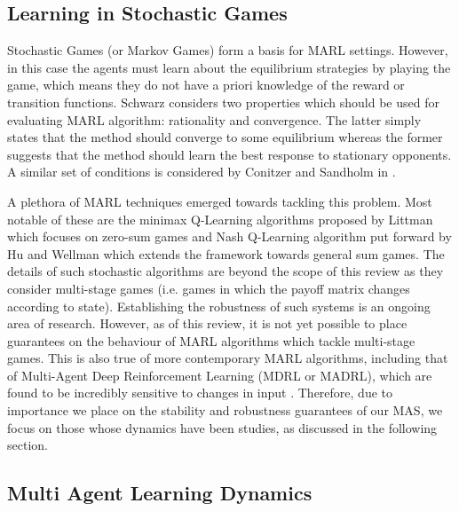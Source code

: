 \documentclass[.../main.tex]{subfiles}
\begin{document}
\subsection{Learning in Stochastic Games} \label{sec::Learning_Stochastic_Games}

Stochastic Games (or Markov Games) form a basis for MARL
settings. However, in this case the agents must learn about the
equilibrium strategies by playing the game, which means they do not
have a priori knowledge of the reward or transition functions. Schwarz \cite{SchwartzMulti-agentApproach}
considers two properties which should be used for evaluating MARL
algorithm: rationality and convergence. The latter simply states that
the method should converge to some equilibrium whereas the former
suggests that the method should learn the best response to stationary
opponents. A similar set of conditions is considered by Conitzer and
Sandholm in \cite{ConitzerAWESOME:}. 

A plethora of MARL techniques emerged towards tackling this problem. Most notable of these are the
minimax Q-Learning algorithms proposed by Littman \cite{Littman} which focuses on zero-sum games and
Nash Q-Learning algorithm put forward by Hu and Wellman \cite{Hu} which extends the framework
towards general sum games. The details of such stochastic algorithms are beyond the scope of this
review as they consider multi-stage games (i.e. games in which the payoff matrix changes according
to state). Establishing the robustness of such systems is an ongoing area of research. However, as
of this review, it is not yet possible to place guarantees on the behaviour of MARL algorithms which
tackle multi-stage games. This is also true of more contemporary MARL algorithms, including that of
Multi-Agent Deep Reinforcement Learning (MDRL or MADRL), which are found to be incredibly sensitive
to changes in input \cite{Gleave}. Therefore, due to importance we place on the stability and
robustness guarantees of our MAS, we focus on those whose dynamics have been studies, as discussed
in the following section.


\subsection{Multi Agent Learning Dynamics} \label{sec::MARL_Dynamics}
\end{document}
